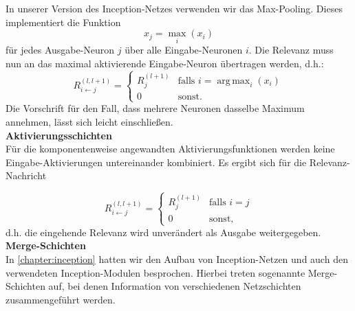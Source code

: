 \documentclass[twoside, 12pt,a4paper]{book}
\DeclareMathOperator*{\argmax}{arg\,max}
\numberwithin{equation}{section}
\begin{document}
	\noindent In unserer Version des Inception-Netzes verwenden wir das Max-Pooling. Dieses implementiert die Funktion
	\begin{equation}
		x_j = \max_i{(x_i)}
	\end{equation}
	für jedes Ausgabe-Neuron $j$ über alle Eingabe-Neuronen $i$. Die Relevanz muss nun an das maximal aktivierende Eingabe-Neuron übertragen werden, d.h.:
	\begin{equation}
	R_{i \leftarrow j}^{(l,l+1)} = \begin{cases}
	R_j^{(l+1)} & \text{falls  } i =\argmax_i{(x_i)}\\
	0			& \text{sonst.}
	\end{cases}
	\end{equation}
	Die Vorschrift für den Fall, dass mehrere Neuronen dasselbe Maximum annehmen, lässt sich leicht einschließen.\\
	
	
	\noindent\textbf{Aktivierungsschichten}\\
	Für die komponentenweise angewandten Aktivierungsfunktionen werden keine Eingabe-Aktivierungen untereinander kombiniert. Es ergibt sich für die Relevanz-Nachricht
	
	\begin{equation}
		R_{i\leftarrow j}^{(l,l+1)} = \begin{cases}
		R_j^{(l+1)} & \text{falls  } i=j\\
		0 &\text{sonst,}
		\end{cases}
	\end{equation} d.h. die eingehende Relevanz wird unverändert als Ausgabe weitergegeben.\\
	
	
	
	\noindent\textbf{Merge-Schichten}\\
	\noindent In \autoref{chapter:inception} hatten wir den Aufbau von Inception-Netzen und auch den verwendeten Inception-Modulen besprochen. Hierbei treten sogenannte Merge-Schichten auf, bei denen Information von verschiedenen Netzschichten zusammengeführt werden.
	
\end{document}

